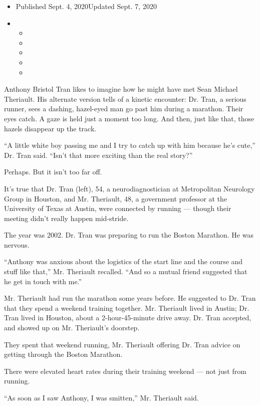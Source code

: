 \begin{itemize}
\item
  Published Sept. 4, 2020Updated Sept. 7, 2020
\item
  \begin{itemize}
  \item
  \item
  \item
  \item
  \item
  \end{itemize}
\end{itemize}

Anthony Bristol Tran likes to imagine how he might have met Sean Michael
Theriault. His alternate version tells of a kinetic encounter: Dr. Tran,
a serious runner, sees a dashing, hazel-eyed man go past him during a
marathon. Their eyes catch. A gaze is held just a moment too long. And
then, just like that, those hazels disappear up the track.

``A little white boy passing me and I try to catch up with him because
he's cute,'' Dr. Tran said. ``Isn't that more exciting than the real
story?''

Perhaps. But it isn't too far off.

It's true that Dr. Tran (left), 54, a neurodiagnostician at Metropolitan
Neurology Group in Houston, and Mr. Theriault, 48, a government
professor at the University of Texas at Austin, were connected by
running --- though their meeting didn't really happen mid-stride.

The year was 2002. Dr. Tran was preparing to run the Boston Marathon. He
was nervous.

``Anthony was anxious about the logistics of the start line and the
course and stuff like that,'' Mr. Theriault recalled. ``And so a mutual
friend suggested that he get in touch with me.''

Mr. Theriault had run the marathon some years before. He suggested to
Dr. Tran that they spend a weekend training together. Mr. Theriault
lived in Austin; Dr. Tran lived in Houston, about a 2-hour-45-minute
drive away. Dr. Tran accepted, and showed up on Mr. Theriault's
doorstep.

They spent that weekend running, Mr. Theriault offering Dr. Tran advice
on getting through the Boston Marathon.

There were elevated heart rates during their training weekend --- not
just from running.

``As soon as I saw Anthony, I was smitten,'' Mr. Theriault said.

